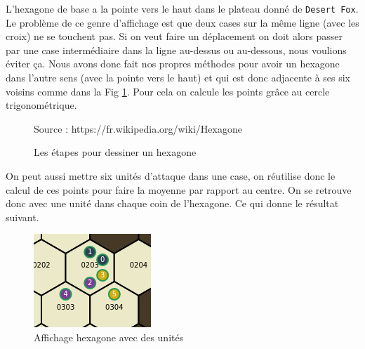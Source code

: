 L'hexagone de base a la pointe vers le haut dans le plateau donné de {\tt Desert Fox}.
Le problème de ce genre d'affichage est que deux cases sur la même ligne (avec les croix) ne se touchent pas. Si on veut faire un déplacement on doit alors passer par une case intermédiaire dans la ligne au-dessus ou au-dessous, nous voulions éviter ça. Nous avons donc fait nos propres méthodes pour avoir un hexagone dans l'autre sens (avec la pointe vers le haut) et qui est donc adjacente à ses six voisins comme dans la Fig \ref{fig:hexagon}. Pour cela on calcule les points grâce au cercle trigonométrique.


\begin{figure}[H]
    \centering
    \def\stackalignment{r}
    {\scriptsize%
        Source : https://fr.wikipedia.org/wiki/Hexagone}
    \caption{Les étapes pour dessiner un hexagone}
    \label{fig:hexagon}
\end{figure}

On peut aussi mettre six unités d'attaque dans une case, on réutilise donc le calcul de ces points pour faire la moyenne par rapport au centre. On se retrouve donc avec une unité dans chaque coin de l'hexagone. Ce qui donne le résultat suivant.

\begin{figure}[H]
    \centering
    \includegraphics[scale=.7]{data/hexagon_with_units.png}
    \caption{Affichage hexagone avec des unités}
    \label{fig:hexagon_with_units}
\end{figure}